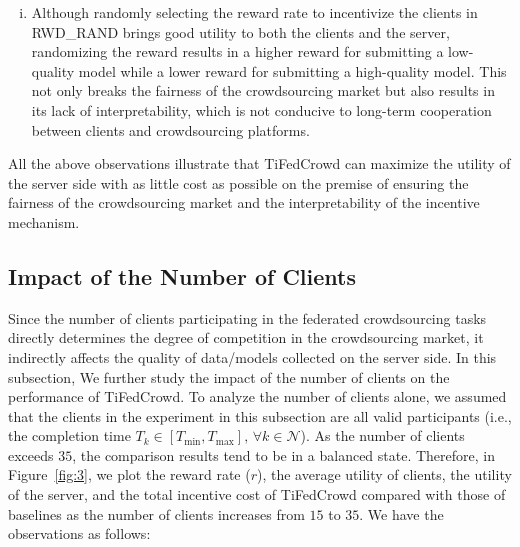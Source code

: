 \documentclass[final,1p,times]{elsarticle}
\begin{document}
\begin{enumerate}[(i)]
	\item Although randomly selecting the reward rate to incentivize the clients in RWD\_RAND brings good utility to both the clients and the server, randomizing the reward results in a higher reward for submitting a low-quality model while a lower reward for submitting a high-quality model. This not only breaks the fairness of the crowdsourcing market but also results in its lack of interpretability, which is not conducive to long-term cooperation between clients and crowdsourcing platforms.
\end{enumerate}

All the above observations illustrate that TiFedCrowd can maximize the utility of the server side with as little cost as possible on the premise of ensuring the fairness of the crowdsourcing market and the interpretability of the incentive mechanism.

\subsection{Impact of the Number of Clients}\label{ITNC}
Since the number of clients participating in the federated crowdsourcing tasks directly determines the degree of competition in the crowdsourcing market, it indirectly affects the quality of data/models collected on the server side. In this subsection, We further study the impact of the number of clients on the performance of TiFedCrowd. To analyze the number of clients alone, we assumed that the clients in the experiment in this subsection are all valid participants (i.e., the completion time $T_k\in[T_{\min},T_{\max}],\,\forall k\in\bm{\mathcal{N}}$). As the number of clients exceeds $35$, the comparison results tend to be in a balanced state. Therefore, in Figure~\ref{fig:3}, we plot the reward rate ($r$), the average utility of clients, the utility of the server, and the total incentive cost of TiFedCrowd compared with those of baselines as the number of clients increases from $15$ to $35$. We have the observations as follows:
\end{document}
